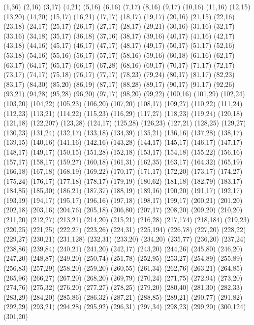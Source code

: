 (1,36)
(2,16)
(3,17)
(4,21)
(5,16)
(6,16)
(7,17)
(8,16)
(9,17)
(10,16)
(11,16)
(12,15)
(13,20)
(14,20)
(15,17)
(16,21)
(17,17)
(18,17)
(19,17)
(20,16)
(21,15)
(22,16)
(23,18)
(24,17)
(25,17)
(26,17)
(27,17)
(28,17)
(29,21)
(30,16)
(31,16)
(32,17)
(33,16)
(34,18)
(35,17)
(36,18)
(37,16)
(38,17)
(39,16)
(40,17)
(41,16)
(42,17)
(43,18)
(44,16)
(45,17)
(46,17)
(47,17)
(48,17)
(49,17)
(50,17)
(51,17)
(52,16)
(53,18)
(54,16)
(55,16)
(56,17)
(57,17)
(58,16)
(59,16)
(60,18)
(61,16)
(62,17)
(63,17)
(64,17)
(65,17)
(66,17)
(67,28)
(68,16)
(69,17)
(70,17)
(71,17)
(72,17)
(73,17)
(74,17)
(75,18)
(76,17)
(77,17)
(78,23)
(79,24)
(80,17)
(81,17)
(82,23)
(83,17)
(84,30)
(85,20)
(86,19)
(87,17)
(88,28)
(89,17)
(90,17)
(91,17)
(92,26)
(93,21)
(94,28)
(95,28)
(96,20)
(97,17)
(98,20)
(99,22)
(100,16)
(101,29)
(102,24)
(103,20)
(104,22)
(105,23)
(106,20)
(107,20)
(108,17)
(109,27)
(110,22)
(111,24)
(112,23)
(113,21)
(114,22)
(115,23)
(116,29)
(117,27)
(118,23)
(119,24)
(120,18)
(121,18)
(122,207)
(123,28)
(124,17)
(125,28)
(126,23)
(127,21)
(128,25)
(129,27)
(130,23)
(131,24)
(132,17)
(133,18)
(134,39)
(135,21)
(136,16)
(137,28)
(138,17)
(139,15)
(140,16)
(141,16)
(142,16)
(143,28)
(144,17)
(145,17)
(146,17)
(147,17)
(148,17)
(149,17)
(150,15)
(151,28)
(152,18)
(153,17)
(154,18)
(155,22)
(156,16)
(157,17)
(158,17)
(159,27)
(160,18)
(161,31)
(162,35)
(163,17)
(164,32)
(165,19)
(166,18)
(167,18)
(168,19)
(169,22)
(170,17)
(171,17)
(172,20)
(173,17)
(174,27)
(175,24)
(176,17)
(177,18)
(178,17)
(179,19)
(180,62)
(181,18)
(182,79)
(183,17)
(184,85)
(185,30)
(186,21)
(187,37)
(188,19)
(189,16)
(190,20)
(191,17)
(192,17)
(193,19)
(194,17)
(195,17)
(196,16)
(197,18)
(198,17)
(199,17)
(200,21)
(201,20)
(202,18)
(203,16)
(204,76)
(205,18)
(206,80)
(207,17)
(208,20)
(209,20)
(210,20)
(211,20)
(212,27)
(213,21)
(214,20)
(215,21)
(216,28)
(217,174)
(218,184)
(219,23)
(220,25)
(221,25)
(222,27)
(223,26)
(224,31)
(225,194)
(226,78)
(227,20)
(228,22)
(229,27)
(230,21)
(231,128)
(232,31)
(233,20)
(234,20)
(235,77)
(236,20)
(237,24)
(238,86)
(239,84)
(240,21)
(241,20)
(242,17)
(243,20)
(244,26)
(245,80)
(246,20)
(247,20)
(248,87)
(249,20)
(250,74)
(251,78)
(252,95)
(253,27)
(254,89)
(255,89)
(256,83)
(257,29)
(258,20)
(259,20)
(260,55)
(261,34)
(262,76)
(263,21)
(264,85)
(265,96)
(266,27)
(267,20)
(268,20)
(269,79)
(270,24)
(271,75)
(272,94)
(273,20)
(274,76)
(275,32)
(276,20)
(277,27)
(278,25)
(279,20)
(280,40)
(281,30)
(282,33)
(283,29)
(284,20)
(285,86)
(286,32)
(287,21)
(288,85)
(289,21)
(290,77)
(291,82)
(292,29)
(293,21)
(294,28)
(295,92)
(296,31)
(297,34)
(298,23)
(299,20)
(300,124)
(301,20)
